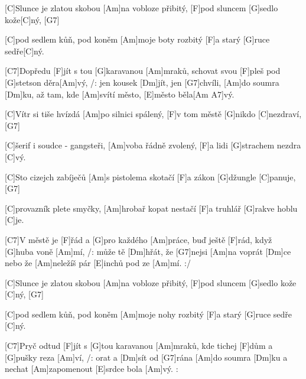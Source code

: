 
[C]Slunce je zlatou skobou [Am]na vobloze přibitý, 
[F]pod sluncem [G]sedlo kože[C]ný, [G7]

[C]pod sedlem kůň, pod koněm [Am]moje boty rozbitý
[F]a starý [G]ruce sedře[C]ný.

[C7]Dopředu [F]jít s tou [G]karavanou [Am]mraků,
schovat svou [F]pleš pod [G]stetson děra[Am]vý,
/: jen kousek [Dm]jít, jen [G7]chvíli, [Am]do soumra [Dm]ku,
až tam, kde [Am]svítí město, [E]město běla[Am A7]vý.

[C]Vítr si tiše hvízdá [Am]po silnici spálený,
[F]v tom městě [G]nikdo [C]nezdraví, [G7]

[C]\null šerif i soudce - gangsteři, [Am]voba řádně zvolený,
[F]a lidi [G]strachem nezdra [C]vý.

[C]Sto cizejch zabíječů [Am]s pistolema skotačí
[F]a zákon [G]džungle [C]panuje, [G7]

[C]provazník plete smyčky, [Am]hrobař kopat nestačí
[F]a truhlář [G]rakve hoblu [C]je.

[C7]V městě je [F]\null řád a [G]pro každého [Am]práce,
buď ještě [F]rád, když [G]huba voně [Am]mí,
/: může tě [Dm]hřát, že [G7]nejsi [Am]na voprát [Dm]ce
nebo že [Am]neležíš pár [E]inchů pod ze [Am]mí. :/

[C]Slunce je zlatou skobou [Am]na vobloze přibitý,
[F]pod sluncem [G]sedlo kože [C]ný, [G7]

[C]pod sedlem kůň, pod koněm [Am]moje nohy rozbitý
[F]a starý [G]ruce sedře [C]ný.

[C7]Pryč odtud [F]jít s [G]tou karavanou [Am]mraků,
kde tichej [F]dům a [G]pušky reza [Am]ví,
/: orat a [Dm]sít od [G7]rána [Am]do soumra [Dm]ku
a nechat [Am]zapomenout [E]srdce bola [Am]vý. :

